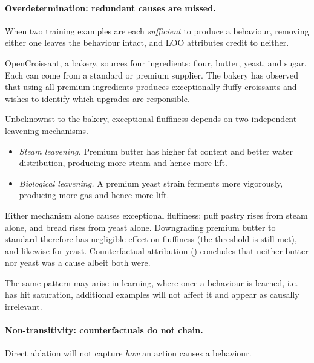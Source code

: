 \documentclass[11pt]{article}
\begin{document}
\paragraph{Overdetermination: redundant causes are missed.} When two training examples are each \emph{sufficient} to produce a behaviour, removing either one leaves the behaviour intact, and LOO attributes credit to neither.

\begin{example}\label{ex:croissant}
  OpenCroissant, a bakery, sources four ingredients: flour, butter, yeast, and sugar. Each can come from a standard or premium supplier. The bakery has observed that using all premium ingredients produces exceptionally fluffy croissants and wishes to identify which upgrades are responsible.

  Unbeknownst to the bakery, exceptional fluffiness depends on two independent leavening mechanisms.
  \begin{itemize}
    \item \emph{Steam leavening.} Premium butter has higher fat content and better water distribution, producing more steam and hence more lift.
    \item \emph{Biological leavening.} A premium yeast strain ferments more vigorously, producing more gas and hence more lift.
  \end{itemize}
  Either mechanism alone causes exceptional fluffiness: puff pastry rises from steam alone, and bread rises from yeast alone. Downgrading premium butter to standard therefore has negligible effect on fluffiness (the threshold is still met), and likewise for yeast. Counterfactual attribution () concludes that neither butter nor yeast was a cause albeit both were.
\end{example}

The same pattern may arise in learning, where once a behaviour is learned, i.e. has hit saturation, additional examples will not affect it and appear as causally irrelevant.


\paragraph{Non-transitivity: counterfactuals do not chain.} Direct ablation will not capture \emph{how} an action causes a behaviour.
\end{document}

